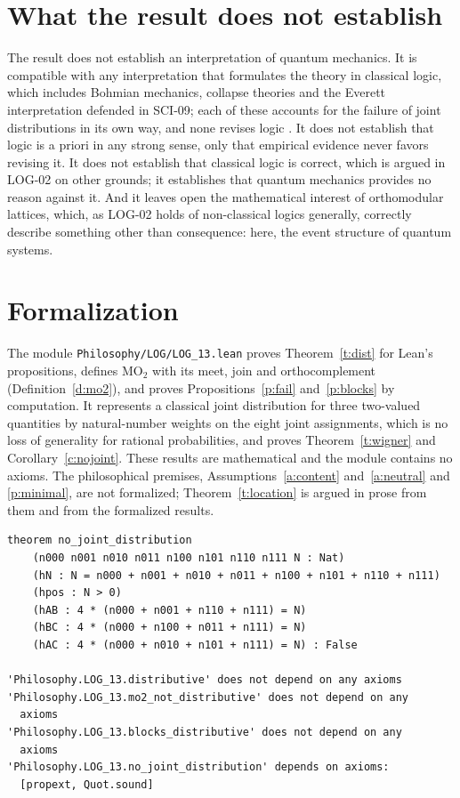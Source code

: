 \documentclass{situationist-preprint}
\begin{document}
\section{What the result does not establish}

The result does not establish an interpretation of quantum mechanics. It is compatible with any interpretation that formulates the theory in classical logic, which includes Bohmian mechanics, collapse theories and the Everett interpretation defended in SCI-09; each of these accounts for the failure of joint distributions in its own way, and none revises logic \citep{Maudlin2005}. It does not establish that logic is a priori in any strong sense, only that empirical evidence never favors revising it. It does not establish that classical logic is correct, which is argued in LOG-02 on other grounds; it establishes that quantum mechanics provides no reason against it. And it leaves open the mathematical interest of orthomodular lattices, which, as LOG-02 holds of non-classical logics generally, correctly describe something other than consequence: here, the event structure of quantum systems.

\section{Formalization}

The module \nolinkurl{Philosophy/LOG/LOG_13.lean} proves Theorem~\ref{t:dist} for Lean's propositions, defines $\mathrm{MO}_2$ with its meet, join and orthocomplement (Definition~\ref{d:mo2}), and proves Propositions~\ref{p:fail} and~\ref{p:blocks} by computation. It represents a classical joint distribution for three two-valued quantities by natural-number weights on the eight joint assignments, which is no loss of generality for rational probabilities, and proves Theorem~\ref{t:wigner} and Corollary~\ref{c:nojoint}. These results are mathematical and the module contains no axioms. The philosophical premises, Assumptions~\ref{a:content} and~\ref{a:neutral} and \ref{p:minimal}, are not formalized; Theorem~\ref{t:location} is argued in prose from them and from the formalized results.

\begin{lstlisting}
theorem no_joint_distribution
    (n000 n001 n010 n011 n100 n101 n110 n111 N : Nat)
    (hN : N = n000 + n001 + n010 + n011 + n100 + n101 + n110 + n111)
    (hpos : N > 0)
    (hAB : 4 * (n000 + n001 + n110 + n111) = N)
    (hBC : 4 * (n000 + n100 + n011 + n111) = N)
    (hAC : 4 * (n000 + n010 + n101 + n111) = N) : False

'Philosophy.LOG_13.distributive' does not depend on any axioms
'Philosophy.LOG_13.mo2_not_distributive' does not depend on any
  axioms
'Philosophy.LOG_13.blocks_distributive' does not depend on any
  axioms
'Philosophy.LOG_13.no_joint_distribution' depends on axioms:
  [propext, Quot.sound]
\end{lstlisting}
\end{document}
